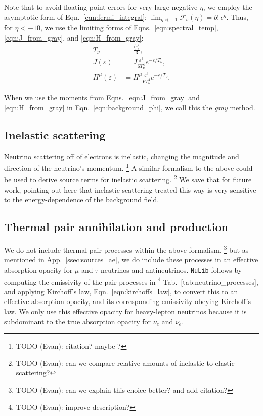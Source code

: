 \documentclass[aps,floatfix,prd,superscriptaddress,twocolumn]{revtex4-1}
\begin{document}
Note that to avoid floating point errors for very large negative $\eta$,
we employ the asymptotic form of Eqn.~\ref{eqn:fermi_integral}:
$\lim_{\eta\ll-1}\mathscr{F}_b(\eta) = b!\,e^\eta$.
Thus, for $\eta<-10$, we use the limiting forms of
Eqns.~\ref{eqn:spectral_temp},
\ref{eqn:J_from_gray},
and \ref{eqn:H_from_gray}:
\begin{align}
    T_\nu &= 
    \frac{\langle \varepsilon \rangle}{3}, \\
    J(\varepsilon) &=
    J \frac{\varepsilon^3}{6 T_\nu^4} e^{-\varepsilon/T_\nu}, \\
    H^\mu(\varepsilon) &=
    H^\mu \frac{\varepsilon^3}{6 T_\nu^4} e^{-\varepsilon/T_\nu}.
\end{align}

When we use the moments from Eqns.~\ref{eqn:J_from_gray} and
\ref{eqn:H_from_gray} in Eqn.~\ref{eqn:background_phi},
we call this the \emph{gray} method.

\subsection{Inelastic scattering}
\label{ssec:sources_si}
Neutrino scattering off of electrons is inelastic, changing the
magnitude and direction of the neutrino's momentum.
\footnote{TODO (Evan): citation? maybe \cite{keil2003-pinched_spectra}?}
A similar formalism to the above could be used to derive source terms
for inelastic scattering.
\footnote{TODO (Evan): can we compare relative amounts of inelastic to
  elastic scattering?}
We save that for future work, pointing out here that inelastic scattering
treated this way is very sensitive to the energy-dependence of
the background field.

\subsection{Thermal pair annihilation and production}
\label{ssec:sources_pp}
We do not include thermal pair processes within the above formalism,
\footnote{TODO (Evan): can we explain this choice better? and add citation?}
but as mentioned in App.~\ref{ssec:sources_ae}, we do include
these processes in an effective absorption opacity for $\mu$ and $\tau$
neutrinos and antineutrinos. \lstinline{NuLib} follows
\cite{brue1985-core_collapse,burr2006-neutrino_opacities}
by computing the emissivity of the pair processes in
\footnote{TODO (Evan): improve description?}
Tab.~\ref{tab:neutrino_processes}, and applying Kirchoff's law,
Eqn.~\ref{eqn:kirchoffs_law}, to convert this to an effective absorption opacity,
and its corresponding emissivity obeying Kirchoff's law.
We only use this effective opacity for heavy-lepton neutrinos because
it is subdominant to the true absorption opacity for
$\nu_e$ and $\bar{\nu}_e$.


\end{document}
